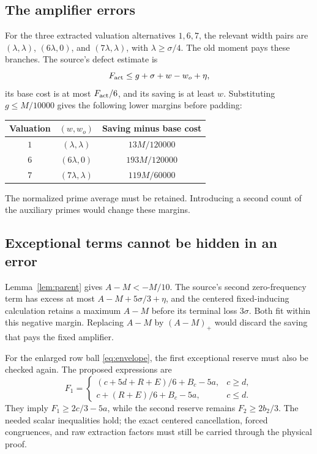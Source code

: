 \documentclass[11pt]{article}
\theoremstyle{definition}
\begin{document}
\subsection{The amplifier errors}
For the three extracted valuation alternatives $1,6,7$, the relevant
width pairs are $(\lambda,\lambda)$, $(6\lambda,0)$, and
$(7\lambda,\lambda)$, with $\lambda\ge\sigma/4$. The old moment
pays these branches. The source's defect estimate is
\[
 F_{\rm act}\le g+\sigma+w-w_o+\eta,
\]
its base cost is at most $F_{\rm act}/6$, and its saving is at least
$w$. Substituting $g\le M/10000$ gives the following lower margins
before padding:
\begin{center}
\begin{tabular}{ccc}
\toprule
Valuation & $(w,w_o)$ & Saving minus base cost\\
\midrule
$1$ & $(\lambda,\lambda)$ & $13M/120000$\\
$6$ & $(6\lambda,0)$ & $193M/120000$\\
$7$ & $(7\lambda,\lambda)$ & $119M/60000$\\
\bottomrule
\end{tabular}
\end{center}
The normalized prime average must be retained. Introducing a second
count of the auxiliary primes would change these margins.

\subsection{Exceptional terms cannot be hidden in an error}
Lemma~\ref{lem:parent} gives $A-M<-M/10$. The source's second
zero-frequency term has excess at most $A-M+5\sigma/3+\eta$, and
the centered fixed-inducing calculation retains a maximum $A-M$ before
its terminal loss $3\sigma$. Both fit within this negative margin.
Replacing $A-M$ by $(A-M)_+$ would discard the saving that pays the
fixed amplifier.

For the enlarged row ball \eqref{eq:envelope}, the first exceptional
reserve must also be checked again. The proposed expressions are
\[
 F_1=\begin{cases}
 (c+5d+R+E)/6+B_c-5a,&c\ge d,\\
 c+(R+E)/6+B_c-5a,&c\le d.
 \end{cases}
\]
They imply $F_1\ge2c/3-5a$, while the second reserve remains
$F_2\ge2b_2/3$. The needed scalar inequalities hold; the exact
centered cancellation, forced congruences, and raw extraction factors
must still be carried through the physical proof.
\end{document}
